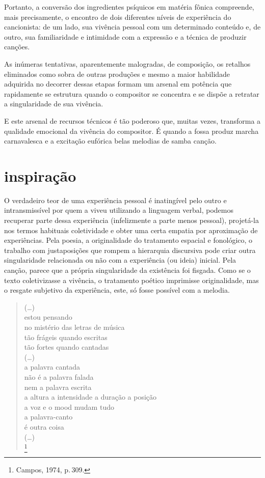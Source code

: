 Portanto, a conversão dos ingredientes psíquicos em matéria fônica
compreende, mais precisamente, o encontro de dois diferentes níveis de
experiência do cancionista: de um lado, sua vivência pessoal com um
determinado conteúdo e, de outro, sua familiaridade e intimidade com a
expressão e a técnica de produzir canções.

As inúmeras tentativas, aparentemente malogradas, de composição, os
retalhos eliminados como sobra de outras produções e mesmo a maior
habilidade adquirida no decorrer dessas etapas formam um arsenal em
potência que rapidamente se estrutura quando o compositor se concentra e
se dispõe a retratar a singularidade de sua vivência.

E este arsenal de recursos técnicos é tão poderoso que, muitas vezes,
transforma a qualidade emocional da vivência do compositor. É quando a
fossa produz marcha carnavalesca e a excitação eufórica belas melodias
de samba canção.

\section{inspiração}

O verdadeiro teor de uma experiência pessoal é inatingível pelo outro e
intransmissível por quem a viveu utilizando a linguagem verbal, podemos
recuperar parte dessa experiência (infelizmente a parte menos pessoal),
projetá-la nos termos habituais coletividade e obter uma certa empatia
por aproximação de experiências. Pela poesia, a originalidade do
tratamento espacial e fonológico, o trabalho com justaposições que
rompem a hierarquia discursiva pode criar outra singularidade
relacionada ou não com a experiência (ou ideia) inicial. Pela canção,
parece que a própria singularidade da existência foi fisgada. Como se o
texto coletivizasse a vivência, o tratamento poético imprimisse
originalidade, mas o resgate subjetivo da experiência, este, só fosse
possível com a melodia.

\begin{verse}
(\ldots)\\
estou pensando\\
no mistério das letras de música\\
tão frágeis quando escritas\\
tão fortes quando cantadas\\
(\ldots)\\
a palavra cantada\\
não é a palavra falada\\
nem a palavra escrita\\
a altura a intensidade a duração a posição\\
a voz e o mood mudam tudo\\
a palavra-canto\\
é outra coisa\\
(\ldots)\\\footnote{Campos, 1974, p.\,309.}
\end{verse}

